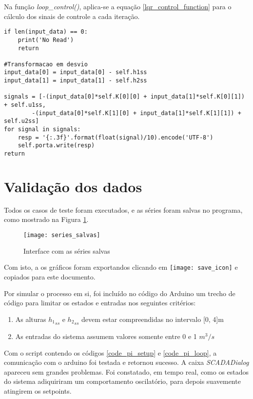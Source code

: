 Na função \emph{loop\_control()}, aplica-se a equação \eqref{lqr_control_function} para o cálculo dos sinais de controle a cada iteração.

\begin{code}
\begin{lstlisting}
if len(input_data) == 0:
	print('No Read')
	return

#Transformacao em desvio
input_data[0] = input_data[0] - self.h1ss
input_data[1] = input_data[1] - self.h2ss

signals = [-(input_data[0]*self.K[0][0] + input_data[1]*self.K[0][1]) + self.u1ss,
		-(input_data[0]*self.K[1][0] + input_data[1]*self.K[1][1]) + self.u2ss]
for signal in signals:
	resp = '{:.3f}'.format(float(signal)/10).encode('UTF-8')
	self.porta.write(resp)
return
\end{lstlisting}
\label{code_lqr_loop}
\end{code}

\section{Validação dos dados}

Todos os casos de teste foram executados, e as séries foram salvas no programa, como mostrado na Figura \ref{img_series_salvas}.

\begin{figure}[htb]
	\centering
	\caption{Interface com as séries salvas}
	\texttt{[image: series\_salvas]}
	\label{img_series_salvas}
\end{figure}

Com isto, a os gráficos foram exportandos clicando em \texttt{[image: save\_icon]} e copiados para este documento.

Por simular o processo em si, foi incluído no código do Arduino um trecho de código para limitar os estados e entradas nos seguintes critérios:

\begin{enumerate}
	\item As alturas ${h_1}_{ss}$ e ${h_2}_{ss}$ devem estar compreendidas no intervalo [0, 4]m
	\item As entradas do sistema assumem valores somente entre 0 e 1 $m^3/s$
\end{enumerate}

Com o script contendo os códigos \ref{code_pi_setup} e \ref{code_pi_loop}, a comunicação com o arduino foi testada e retornou sucesso. A caixa \emph{SCADADialog} apareceu sem grandes problemas. Foi constatado, em tempo real, como os estados do sistema adiquiriram um comportamento oscilatório, para depois suavemente atingirem os setpoints.


